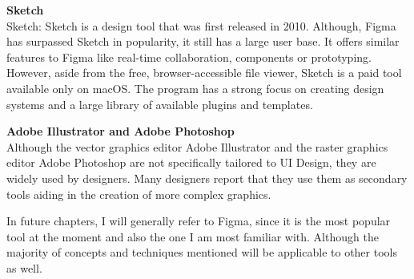\textbf{Sketch}\\
Sketch: Sketch is a design tool that was first released in 2010. Although, Figma has surpassed
Sketch in popularity, it still has a large user base. It offers similar features to Figma like
real-time collaboration, components or prototyping. However, aside from the free, browser-accessible
file viewer, Sketch is a paid tool available only on macOS. The program has a strong focus on
creating design systems and a large library of available plugins and templates.

\textbf{Adobe Illustrator and Adobe Photoshop}\\
Although the vector graphics editor Adobe Illustrator and the raster graphics editor Adobe Photoshop
are not specifically tailored to UI Design, they are widely used by designers. Many designers report
that they use them as secondary tools aiding in the creation of more complex graphics.

In future chapters, I will generally refer to Figma, since it is the most popular tool at the moment
and also the one I am most familiar with. Although the majority of concepts and techniques mentioned
will be applicable to other tools as well.
